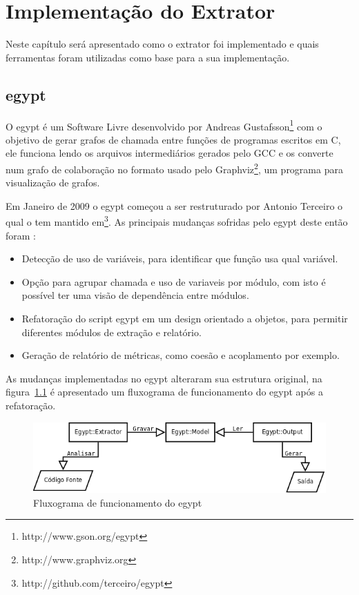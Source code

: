 \chapter{Implementação do Extrator} \label{ch:implementacao}

Neste capítulo será apresentado como o extrator foi implementado e quais
ferramentas foram utilizadas como base para a sua implementação.


\section{egypt} \label{sec:egypt}

O egypt é um Software Livre desenvolvido por Andreas
Gustafsson\footnote{http://www.gson.org/egypt} com o objetivo de gerar grafos
de chamada entre funções de programas escritos em C, ele funciona lendo os
arquivos intermediários gerados pelo GCC e os
converte num grafo de colaboração no formato usado pelo
Graphviz\footnote{http://www.graphviz.org}, um programa para visualização de
grafos.

Em Janeiro de 2009 o egypt começou a ser restruturado por
Antonio Terceiro o qual o tem mantido
em\footnote{http://github.com/terceiro/egypt}. As principais mudanças sofridas
pelo egypt deste então foram \cite{structuralComplexityEvolution}:

\begin{itemize}
\item Detecção de uso de variáveis, para identificar que função usa qual
variável.
\item Opção para agrupar chamada e uso de variaveis por módulo, com isto é
possível ter uma visão de dependência entre módulos.
\item Refatoração do script egypt em um design orientado a objetos, para
permitir diferentes módulos de extração e relatório.
\item Geração de relatório de métricas, como coesão e acoplamento por exemplo.
\end{itemize}

As mudanças implementadas no egypt alteraram sua estrutura original, na
figura~\ref{fig:egypt-fluxogram} é apresentado um fluxograma de funcionamento
do egypt após a refatoração.

\begin{figure}[h]
\center
\includegraphics[scale=0.4]{imagens/egypt-fluxogram}
\caption{Fluxograma de funcionamento do egypt}
\label{fig:egypt-fluxogram}
\end{figure}

